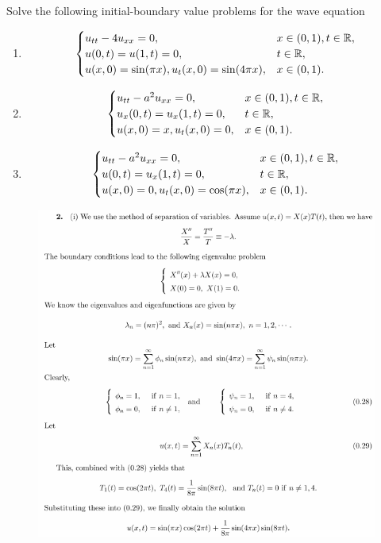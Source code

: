 \begin{question}{5.2}{}
    Solve the following initial-boundary value problems for the wave equation
    \begin{enumerate}[label=(\roman*)]
        \item \[
                \begin{cases}
                    u_{tt} - 4u_{xx} = 0, & x\in(0,1), t\in\mathbb{R}, \\
                    u(0,t) = u(1,t) = 0, & t\in\mathbb{R}, \\
                    u(x,0)=\sin(\pi x), u_t(x,0)=\sin(4\pi x), & x\in(0,1). \\
                \end{cases}
            \]
        \item \[
                \begin{cases}
                    u_{tt} - a^2u_{xx} = 0, & x\in(0,1), t\in\mathbb{R}, \\
                    u_x(0,t) = u_x(1,t) = 0, & t\in\mathbb{R}, \\
                    u(x,0)=x, u_t(x,0)=0, & x\in(0,1). \\
                \end{cases}
            \]
        \item \[
                \begin{cases}
                    u_{tt} - a^2u_{xx} = 0, & x\in(0,1), t\in\mathbb{R}, \\
                    u(0,t) = u_x(1,t) = 0, & t\in\mathbb{R}, \\
                    u(x,0)=0, u_t(x,0)=\cos(\pi x), & x\in(0,1). \\
                \end{cases}
            \]
    \end{enumerate}
\end{question}
\begin{figure}[H]
    \includegraphics[width=.9\textwidth]{figures/5.2-1.png}
\end{figure}
